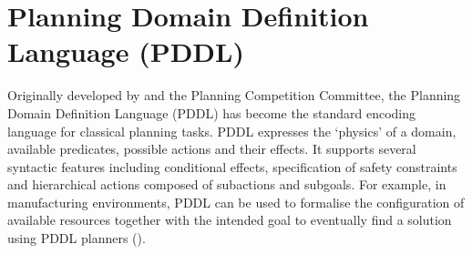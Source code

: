 \section{Planning Domain Definition Language (PDDL)}\label{subsec:PDDL}
Originally developed by \cite{mcdermott1998pddl} and the Planning Competition Committee, the Planning Domain Definition Language (PDDL) has become the standard encoding language for classical planning tasks. 
PDDL expresses the `physics' of a domain, \ie available predicates, possible actions and their effects.
It supports several syntactic features including conditional effects, specification of safety constraints and hierarchical actions composed of subactions and subgoals. 
For example, in manufacturing environments, PDDL can be used to formalise the configuration of available resources together with the intended goal to eventually find a solution using PDDL planners (\cite{huckaby2013planning}). 
%


